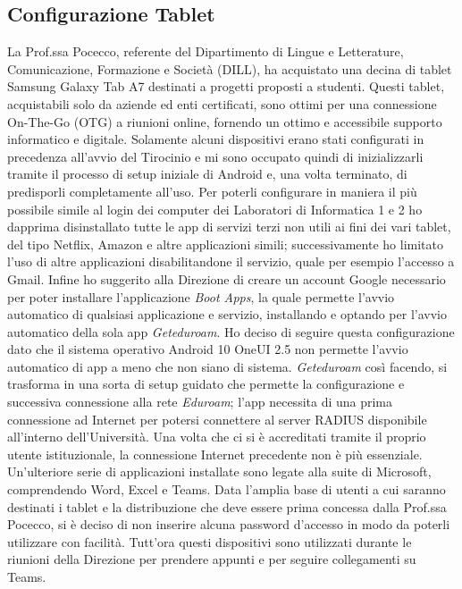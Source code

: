             \subsection{Configurazione Tablet}
                La Prof.ssa Pocecco, referente del Dipartimento di Lingue e Letterature, Comunicazione, Formazione e Società (DILL), ha acquistato una decina di tablet Samsung Galaxy Tab A7 destinati a progetti proposti a studenti. Questi tablet, acquistabili solo da aziende ed enti certificati, sono ottimi per una connessione On-The-Go (OTG) a riunioni online, fornendo un ottimo e accessibile supporto informatico e digitale. \newline
                Solamente alcuni dispositivi erano stati configurati in precedenza all'avvio del Tirocinio e mi sono occupato quindi di inizializzarli tramite il processo di setup iniziale di Android e, una volta terminato, di predisporli completamente all'uso. \newline
                Per poterli configurare in maniera il più possibile simile al login dei computer dei Laboratori di Informatica 1 e 2 ho dapprima disinstallato tutte le app di servizi terzi non utili ai fini dei vari tablet, del tipo Netflix, Amazon e altre applicazioni simili; successivamente ho limitato l'uso di altre applicazioni disabilitandone il servizio, quale per esempio l'accesso a Gmail. Infine ho suggerito alla Direzione di creare un account Google necessario per poter  installare l'applicazione \textsl{Boot Apps}, la quale permette l'avvio automatico di qualsiasi applicazione e servizio, installando e optando per l'avvio automatico della sola app \textsl{Geteduroam}. Ho deciso di seguire questa configurazione dato che il sistema operativo Android 10 OneUI 2.5 non permette l'avvio automatico di app a meno che non siano di sistema. \textsl{Geteduroam} così facendo, si trasforma in una sorta di setup guidato che permette la configurazione e successiva connessione alla rete \textsl{Eduroam}; l'app necessita di una prima connessione ad Internet per potersi connettere al server RADIUS disponibile all'interno dell'Università. Una volta che ci si è accreditati tramite il proprio utente istituzionale, la connessione Internet precedente non è più essenziale. \newline
                Un'ulteriore serie di applicazioni installate sono legate alla suite di Microsoft, comprendendo Word, Excel e Teams. \newline
                Data l'amplia base di utenti a cui saranno destinati i tablet e la distribuzione che deve essere prima concessa dalla Prof.ssa Pocecco, si è deciso di non inserire alcuna password d'accesso in modo da poterli utilizzare con facilità. Tutt'ora questi dispositivi sono utilizzati durante le riunioni della Direzione per prendere appunti e per seguire collegamenti su Teams. 
